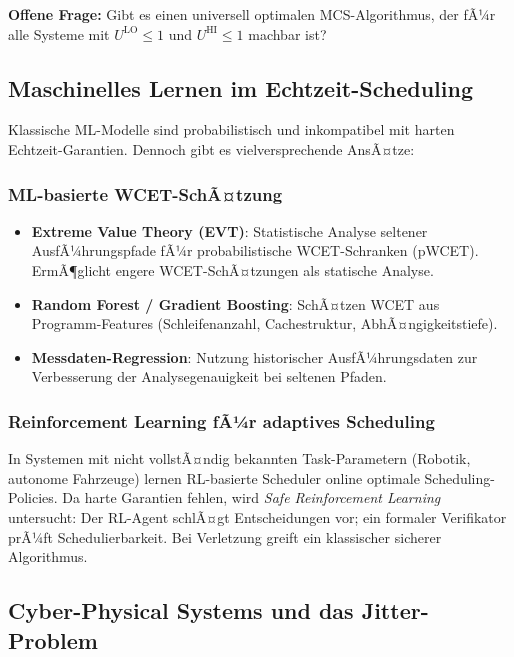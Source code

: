 ﻿\documentclass[a4paper,12pt]{report}
\theoremstyle{definition}
\begin{document}
\textbf{Offene Frage:} Gibt es einen universell optimalen MCS-Algorithmus,
der fÃ¼r alle Systeme mit $U^{\mathrm{LO}} \leq 1$ und $U^{\mathrm{HI}} \leq 1$
machbar ist?

\subsection{Maschinelles Lernen im Echtzeit-Scheduling}

Klassische ML-Modelle sind probabilistisch und inkompatibel mit harten
Echtzeit-Garantien. Dennoch gibt es vielversprechende AnsÃ¤tze:

\subsubsection{ML-basierte WCET-SchÃ¤tzung}

\begin{itemize}
	\item \textbf{Extreme Value Theory (EVT)}: Statistische Analyse seltener
	      AusfÃ¼hrungspfade fÃ¼r probabilistische WCET-Schranken (pWCET).
	      ErmÃ¶glicht engere WCET-SchÃ¤tzungen als statische Analyse.
	\item \textbf{Random Forest / Gradient Boosting}: SchÃ¤tzen WCET aus
	      Programm-Features (Schleifenanzahl, Cachestruktur, AbhÃ¤ngigkeitstiefe).
	\item \textbf{Messdaten-Regression}: Nutzung historischer AusfÃ¼hrungsdaten
	      zur Verbesserung der Analysegenauigkeit bei seltenen Pfaden.
\end{itemize}

\subsubsection{Reinforcement Learning fÃ¼r adaptives Scheduling}

In Systemen mit nicht vollstÃ¤ndig bekannten Task-Parametern (Robotik, autonome
Fahrzeuge) lernen RL-basierte Scheduler online optimale Scheduling-Policies.
Da harte Garantien fehlen, wird \emph{Safe Reinforcement Learning} untersucht:
Der RL-Agent schlÃ¤gt Entscheidungen vor; ein formaler Verifikator prÃ¼ft
Schedulierbarkeit. Bei Verletzung greift ein klassischer sicherer Algorithmus.

\subsection{Cyber-Physical Systems und das Jitter-Problem}
\end{document}
